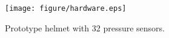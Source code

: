 \documentclass[sigchi,authordraft]{acmart}
\newcommand\figref[1]{\textbf{Figure~\ref{fig:#1}}}
\begin{document}

\begin{figure}[!t]
    \centering
    \texttt{[image: figure/hardware.eps]}
  \caption{Prototype helmet with 32 pressure sensors.}
  \label{fig:hard}
\end{figure}




\end{document}
